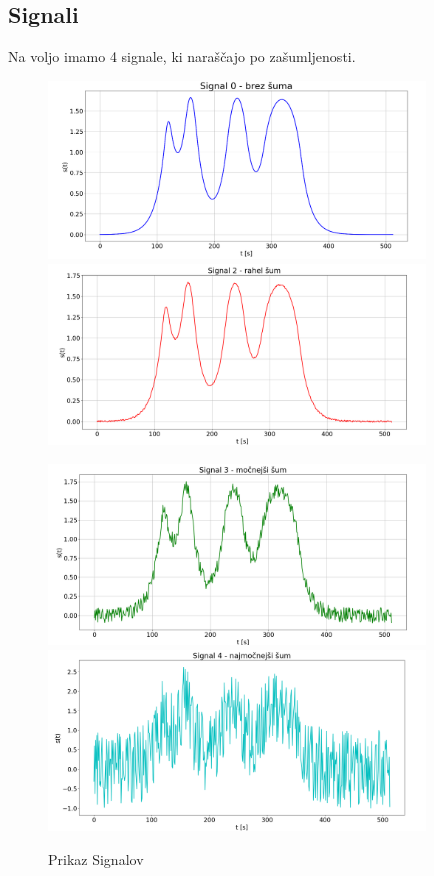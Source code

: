 \documentclass[11pt, a4paper]{article}
\begin{document}
\subsection{Signali}
Na voljo imamo 4 signale, ki naraščajo po zašumljenosti.
\begin{figure}[H]
\hspace{-2cm}
\includegraphics[width=10cm]{druga_prvi.png}
\includegraphics[width=10cm]{druga_prvi2.png}
\end{figure}
\begin{figure}[H]

\hspace{-2cm}
\includegraphics[width=10cm]{druga_prvi3.png}
\includegraphics[width=10cm]{druga_prvi4.png}
\caption{Prikaz Signalov}
\end{figure}
\end{document}
